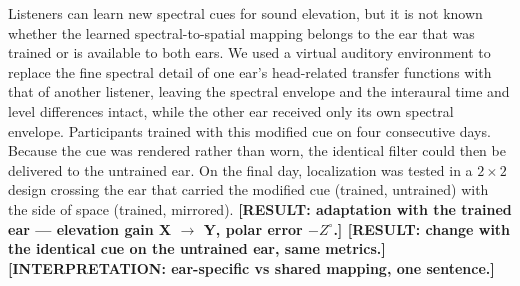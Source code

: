 Listeners can learn new spectral cues for sound elevation, but it is not known
whether the learned spectral-to-spatial mapping belongs to the ear that was
trained or is available to both ears. We used a virtual auditory environment to
replace the fine spectral detail of one ear's head-related transfer functions
with that of another listener, leaving the spectral envelope and the interaural
time and level differences intact, while the other ear received only its own
spectral envelope. Participants trained with this modified cue on four
consecutive days. Because the cue was rendered rather than worn, the identical
filter could then be delivered to the untrained ear. On the final day,
localization was tested in a $2 \times 2$ design crossing the ear that carried
the modified cue (trained, untrained) with the side of space (trained,
mirrored). \textbf{[RESULT: adaptation with the trained ear --- elevation gain
X $\to$ Y, polar error $-Z^\circ$.] [RESULT: change with the identical cue on
the untrained ear, same metrics.] [INTERPRETATION: ear-specific vs shared
mapping, one sentence.]}
